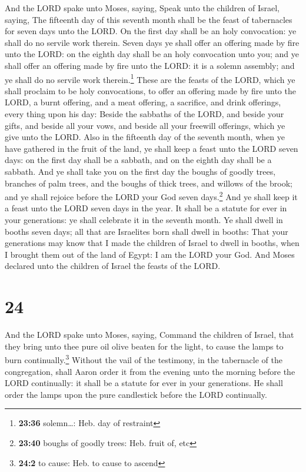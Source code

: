  And the LORD spake unto Moses, saying, 
Speak unto the children of Israel, saying, The fifteenth day of this
seventh month shall be the feast of tabernacles for seven days unto the
LORD.  On the first day shall be an holy convocation: ye
shall do no servile work therein.  Seven days ye shall
offer an offering made by fire unto the LORD: on the eighth day shall be
an holy convocation unto you; and ye shall offer an offering made by
fire unto the LORD: it is a solemn assembly; and ye shall do no servile
work therein.\footnote{\textbf{23:36} solemn\ldots: Heb. day of
  restraint}  These are the feasts of the LORD, which ye
shall proclaim to be holy convocations, to offer an offering made by
fire unto the LORD, a burnt offering, and a meat offering, a sacrifice,
and drink offerings, every thing upon his day:  Beside
the sabbaths of the LORD, and beside your gifts, and beside all your
vows, and beside all your freewill offerings, which ye give unto the
LORD.  Also in the fifteenth day of the seventh month,
when ye have gathered in the fruit of the land, ye shall keep a feast
unto the LORD seven days: on the first day shall be a sabbath, and on
the eighth day shall be a sabbath.  And ye shall take you
on the first day the boughs of goodly trees, branches of palm trees, and
the boughs of thick trees, and willows of the brook; and ye shall
rejoice before the LORD your God seven days.\footnote{\textbf{23:40}
  boughs of goodly trees: Heb. fruit of, etc}  And ye
shall keep it a feast unto the LORD seven days in the year. It shall be
a statute for ever in your generations: ye shall celebrate it in the
seventh month.  Ye shall dwell in booths seven days; all
that are Israelites born shall dwell in booths:  That
your generations may know that I made the children of Israel to dwell in
booths, when I brought them out of the land of Egypt: I am the LORD your
God.  And Moses declared unto the children of Israel the
feasts of the LORD.

\hypertarget{section-23}{%
\section{24}\label{section-23}}

 And the LORD spake unto Moses, saying, 
Command the children of Israel, that they bring unto thee pure oil olive
beaten for the light, to cause the lamps to burn continually.\footnote{\textbf{24:2}
  to cause: Heb. to cause to ascend}  Without the vail of
the testimony, in the tabernacle of the congregation, shall Aaron order
it from the evening unto the morning before the LORD continually: it
shall be a statute for ever in your generations.  He shall
order the lamps upon the pure candlestick before the LORD continually.

